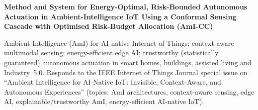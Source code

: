 \documentclass[10pt,a4paper]{article}
\newcommand{\sect}[1]{\par\vspace{5pt}{\bfseries\large #1}\par\vspace{1pt}}
\begin{document}
\sect{1. Title of the invention}
\textbf{Method and System for Energy-Optimal, Risk-Bounded Autonomous Actuation in Ambient-Intelligence IoT Using a Conformal Sensing Cascade with Optimised Risk-Budget Allocation (AmI-CC)}

\sect{2. Field / Area of invention}
Ambient Intelligence (AmI) for AI-native Internet of Things; context-aware multimodal sensing; energy-efficient edge AI; trustworthy (statistically guaranteed) autonomous actuation in smart homes, buildings, assisted living and Industry~5.0. Responds to the IEEE Internet of Things Journal special issue on ``Ambient Intelligence for AI-Native IoT: Invisible, Context-Aware, and Autonomous Experiences'' (topics: AmI architectures, context-aware sensing, edge AI, explainable/trustworthy AmI, energy-efficient AI-native IoT).
\end{document}
